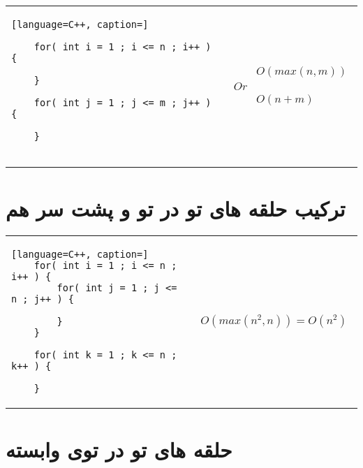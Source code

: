 \documentclass[12pt]{book}
\begin{document}
\begin{latin}
\begin{center}
  \bgroup
  \def\arraystretch{1.5}%
  \begin{tabular}{ Y C  }
    \begin{lstlisting}[language=C++, caption=]

	for( int i = 1 ; i <= n ; i++ ) {
	
	}
	
	for( int j = 1 ; j <= m ; j++ ) {
	
	}
			
	\end{lstlisting}
    &
    \colorbox{gray!10}{\parbox{90pt}{
    \begin{align*}
    &O(max(n,m))
    \\ Or \\
    &O(n + m)
    \end{align*}
    }}
  \end{tabular}
  \egroup
\end{center}
\end{latin}



\section{ترکیب حلقه های تو در تو و پشت سر هم}




\begin{latin}
\begin{center}
  \bgroup
  \def\arraystretch{1.5}%
  \begin{tabular}{ Y C  }
    \begin{lstlisting}[language=C++, caption=]
	for( int i = 1 ; i <= n ; i++ ) {
		for( int j = 1 ; j <= n ; j++ ) {
		
		}
	}
	
	for( int k = 1 ; k <= n ; k++ ) {
	
	}	
	\end{lstlisting}
    &
    \colorbox{gray!10}{\parbox{90pt}{
    \begin{align*}
    O(max(n^{2},n)) = O(n^{2})
    \end{align*}
    }}
  \end{tabular}
  \egroup
\end{center}
\end{latin}



\section{حلقه های تو در توی وابسته}
\end{document}
